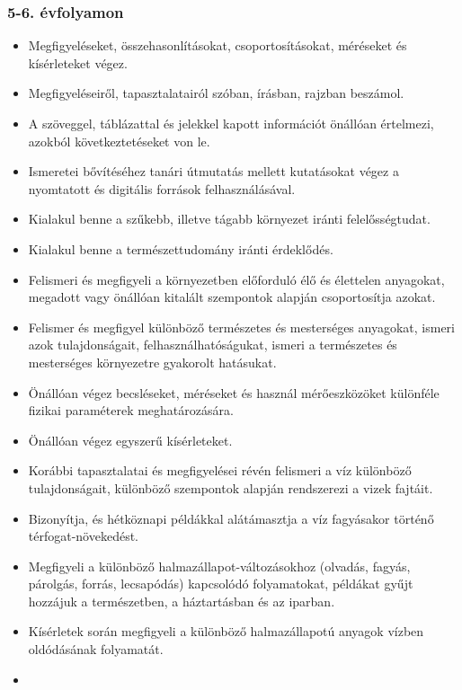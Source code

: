 \hypertarget{evfolyamon-32}{%
\subsubsection{5-6. évfolyamon}\label{evfolyamon-32}}

\begin{itemize}
\item
  Megfigyeléseket, összehasonlításokat, csoportosításokat, méréseket és
  kísérleteket végez.
\item
  Megfigyeléseiről, tapasztalatairól szóban, írásban, rajzban beszámol.
\item
  A szöveggel, táblázattal és jelekkel kapott információt önállóan
  értelmezi, azokból következtetéseket von le.
\item
  Ismeretei bővítéséhez tanári útmutatás mellett kutatásokat végez a
  nyomtatott és digitális források felhasználásával.
\item
  Kialakul benne a szűkebb, illetve tágabb környezet iránti
  felelősségtudat.
\item
  Kialakul benne a természettudomány iránti érdeklődés.
\item
  Felismeri és megfigyeli a környezetben előforduló élő és élettelen
  anyagokat, megadott vagy önállóan kitalált szempontok alapján
  csoportosítja azokat.
\item
  Felismer és megfigyel különböző természetes és mesterséges anyagokat,
  ismeri azok tulajdonságait, felhasználhatóságukat, ismeri a
  természetes és mesterséges környezetre gyakorolt hatásukat.
\item
  Önállóan végez becsléseket, méréseket és használ mérőeszközöket
  különféle fizikai paraméterek meghatározására.
\item
  Önállóan végez egyszerű kísérleteket.
\item
  Korábbi tapasztalatai és megfigyelései révén felismeri a víz különböző
  tulajdonságait, különböző szempontok alapján rendszerezi a vizek
  fajtáit.
\item
  Bizonyítja, és hétköznapi példákkal alátámasztja a víz fagyásakor
  történő térfogat-növekedést.
\item
  Megfigyeli a különböző halmazállapot-változásokhoz (olvadás, fagyás,
  párolgás, forrás, lecsapódás) kapcsolódó folyamatokat, példákat gyűjt
  hozzájuk a természetben, a háztartásban és az iparban.
\item
  Kísérletek során megfigyeli a különböző halmazállapotú anyagok vízben
  oldódásának folyamatát.
\item

\end{itemize}

